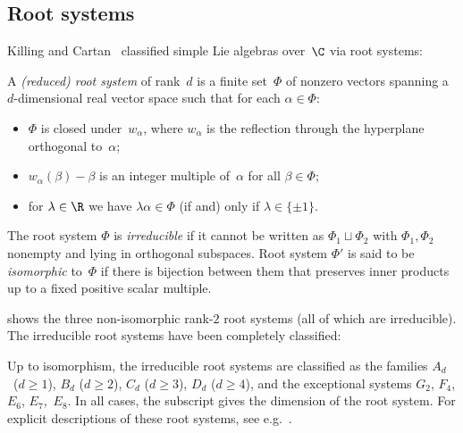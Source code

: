 \documentclass[11pt]{article}
\begin{document}
\subsection{Root systems}

Killing and Cartan~\cite{Car94} classified simple Lie algebras over~$\C$ via root systems:
\begin{definition}
    A \emph{(reduced) root system} of rank~$d$ is a finite set~$\Phi$ of nonzero vectors spanning a $d$-dimensional real vector space such that for each $\alpha \in \Phi$:
    \begin{itemize}
        \item $\Phi$ is closed under~$w_\alpha$, where $w_\alpha$ is the reflection through the hyperplane orthogonal to~$\alpha$;
        \item $w_\alpha(\beta) - \beta$ is an integer multiple of~$\alpha$ for all $\beta \in \Phi$;
        \item for $\lambda \in \R$ we have $\lambda \alpha \in \Phi$ (if and) only if $\lambda \in \{\pm 1\}$.
    \end{itemize}
    The root system $\Phi$ is \emph{irreducible} if it cannot be written as $\Phi_1 \sqcup \Phi_2$ with $\Phi_1, \Phi_2$ nonempty and lying in orthogonal subspaces.
    Root system $\Phi'$ is said to be \emph{isomorphic} to~$\Phi$ if there is bijection between them that preserves inner products up to a fixed positive scalar multiple.
\end{definition}

 shows the three non-isomorphic rank-$2$ root systems (all of which are irreducible).
The irreducible root systems have been completely classified:
\begin{notation}
    Up to isomorphism, the irreducible root systems are classified as the families $A_d$~($d \geq 1$), $B_d$ ($d \geq 2$), $C_d$ ($d \geq 3$), $D_d$ ($d \geq 4$), and the exceptional systems $G_2$, $F_4$, $E_6$, $E_7$,~$E_8$.
    In all cases, the subscript gives the dimension of the root system.
    For explicit descriptions of these root systems, %
    see e.g.~\cite[Sec.~3.6]{Car89}.
\end{notation}
\end{document}
